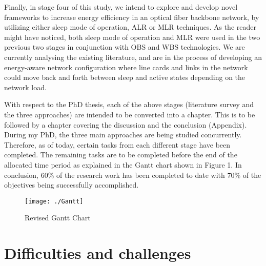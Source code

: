 \documentclass{article}
\begin{document}
Finally, in stage four of this study, we intend to explore and develop novel frameworks to increase energy efficiency in an optical fiber backbone network, by utilizing either sleep mode of operation, ALR or MLR techniques. As the reader might have noticed, both sleep mode of operation and MLR were used in the two previous two stages in conjunction with OBS and WBS technologies. We are currently analysing the existing literature, and are in the process of developing an energy-aware network configuration where line cards and links in the network could move back and forth between sleep and active states depending on the network load. 

With respect to the PhD thesis, each of the above stages (literature survey and the three approaches) are intended to be converted into a chapter. This is to be followed by a chapter covering the discussion and the conclusion (Appendix). During my PhD, the three main approaches are being studied concurrently. Therefore, as of today, certain tasks from each different stage have been completed. The remaining tasks are to be completed before the end of the allocated time period as explained in the Gantt chart shown in Figure 1. In conclusion, 60\% of the research work has been completed to date with 70\% of the objectives being successfully accomplished.

\begin{figure}[h]
\centering
\texttt{[image: ./Gantt]}
\caption{Revised Gantt Chart}
\label{fig:Gantt}
\end{figure}


\section{Difficulties and challenges} 
\end{document}

